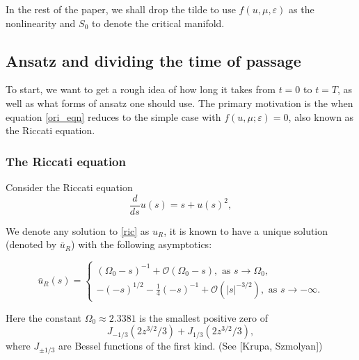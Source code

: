 \documentclass[letterpaper,11pt]{article}
\newcommand{\rmO}{\mathcal{O}}
\newcommand{\eps}{\varepsilon}
\numberwithin{equation}{section}
\theoremstyle{plain}
\begin{document}
In the rest of the paper, we shall drop the tilde to use $f(u,\mu,\eps)$ as the nonlinearity and $S_0$ to denote the critical manifold.
 
\subsection{Ansatz and dividing the time of passage}\label{ansatz_divide}

To start, we want to get a rough idea of how long it takes from $t=0$ to $t=T$, as well as what forms of ansatz one should use. The primary motivation is the when equation \eqref{ori_eqn} reduces to the simple case with $f(u,\mu;\eps) = 0$, also known as the Riccati equation.

\subsubsection{The Riccati equation}
Consider the Riccati equation
\begin{equation}\label{ric}
\frac{d}{ds}u(s) = s+u(s)^2,
\end{equation}

We denote any solution to \eqref{ric} as $u_R$, it is known to have a unique solution (denoted by $\bar{u}_R$) with the following asymptotics:

\begin{equation} \label{ric_asy}
\bar{u}_R(s)=\begin{cases}
  (\Omega_0-s)^{-1}+\rmO(\Omega_0-s), \text{ as }s \to \Omega_0, \\
 -(-s)^{1/2} -\frac{1}{4}(-s)^{-1} + \rmO(|s|^{-3/2}), \text{ as }s \to -\infty.
\end{cases}
\end{equation}

Here the constant $\Omega_0 \approx 2.3381$ is the smallest positive zero of 
\[
J_{-1/3}(2z^{3/2}/3)+J_{1/3}(2z^{3/2}/3),
\]
where $J_{\pm 1/3}$ are Bessel functions of the first kind. (See [Krupa, Szmolyan])
\end{document}
